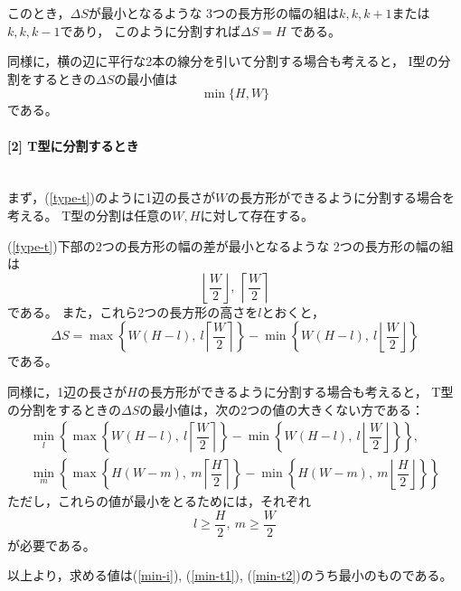 \documentclass{article}
\newcommand{\myparagraph}[1]{\paragraph{#1}\mbox{}\\}
\begin{document}
このとき，$\Delta S$が最小となるような
3つの長方形の幅の組は$k, k, k + 1$または$k, k, k - 1$であり，
このように分割すれば$\Delta S = H$ である。

同様に，横の辺に平行な2本の線分を引いて分割する場合も考えると，
I型の分割をするときの$\Delta S$の最小値は
\begin{equation}
    \label{min-i}
    \min \{H, W\}
\end{equation}
である。

\myparagraph{[2] T型に分割するとき}

まず，(\cref{type-t})のように1辺の長さが$W$の長方形ができるように分割する場合を考える。
T型の分割は任意の$W, H$に対して存在する。

(\cref{type-t})下部の2つの長方形の幅の差が最小となるような
2つの長方形の幅の組は
\begin{equation*}
    \left\lfloor \dfrac{W}{2} \right\rfloor,\ \left\lceil \dfrac{W}{2} \right\rceil
\end{equation*}
である。
また，これら2つの長方形の高さを$l$とおくと，
\begin{equation*}
    \Delta S
    = \max \left\{ W(H - l),\ l \left\lceil  \dfrac{W}{2} \right\rceil \right\}
    - \min \left\{ W(H - l),\ l \left\lfloor \dfrac{W}{2} \right\rfloor \right\}
\end{equation*}
である。

同様に，1辺の長さが$H$の長方形ができるように分割する場合も考えると，
T型の分割をするときの$\Delta S$の最小値は，次の2つの値の大きくない方である：
\begin{eqnarray}
    \label{min-t1}
    \min_{l} \left\{
      \max \left\{ W(H - l),\ l \left\lceil  \dfrac{W}{2} \right\rceil \right\}
    - \min \left\{ W(H - l),\ l \left\lfloor \dfrac{W}{2} \right\rfloor \right\}
    \right\},
    \\
    \label{min-t2}
    \min_{m} \left\{
      \max \left\{ H(W - m),\ m \left\lceil  \dfrac{H}{2} \right\rceil \right\}
    - \min \left\{ H(W - m),\ m \left\lfloor \dfrac{H}{2} \right\rfloor \right\}
    \right\}
\end{eqnarray}
ただし，これらの値が最小をとるためには，それぞれ
\begin{equation*}
    l \geq \frac{H}{2},\ 
    m \geq \frac{W}{2}  
\end{equation*}
が必要である。

以上より，求める値は(\ref{min-i}), (\ref{min-t1}), (\ref{min-t2})のうち最小のものである。
\end{document}
